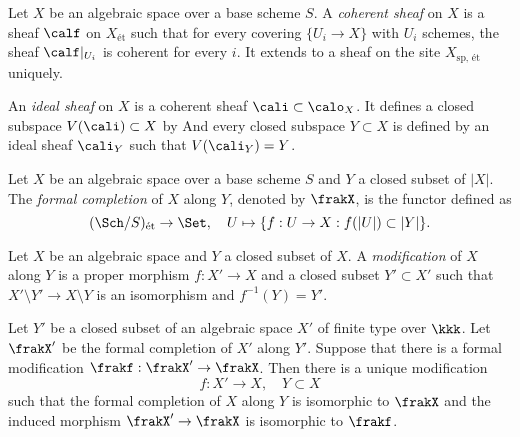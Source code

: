     \begin{definition}\label{def:coherent_sheaf_on_algebraic_space}
        Let \(X\) be an algebraic space over a base scheme \(S\).
        A \emph{coherent sheaf} on \(X\) is a sheaf \(\calf\) on \(X_{\text{\'et}}\) such that for every covering \(\{U_i \to X\}\) with \(U_i\) schemes, the sheaf \(\calf|_{U_i}\) is coherent for every \(i\).
        It extends to a sheaf on the site \(X_{\text{sp, \'et}}\) uniquely.

        An \emph{ideal sheaf} on \(X\) is a coherent sheaf \(\cali \subset \calo_X\).
        It defines a closed subspace \(V(\cali) \subset X\) by 
        And every closed subspace \(Y \subset X\) is defined by an ideal sheaf \(\cali_Y\) such that \(V(\cali_Y) = Y\).
    \end{definition}

    \begin{definition}\label{def:formal_completion_of_algebraic_space}
        Let \(X\) be an algebraic space over a base scheme \(S\) and \(Y\) a closed subset of \(|X|\).
        The \emph{formal completion} of \(X\) along \(Y\), denoted by \(\frakX\), is the functor defined as 
        \[ (\Sch/S)_{\text{\'et}} \to \Set, \quad U \mapsto \{f: U \to X: f(|U|) \subset |Y|\}. \]
    \end{definition}

    \begin{definition}\label{def:modification}
        Let \(X\) be an algebraic space and \(Y\) a closed subset of \(X\).
        A \emph{modification} of \(X\) along \(Y\) is a proper morphism \(f: X' \to X\) and a closed subset \(Y' \subset X'\) such that \(X'\setminus Y' \to X \setminus Y\) is an isomorphism and \(f^{-1}(Y) = Y'\).
    \end{definition}

    \begin{theorem}\label{thm:Artin_existence_of_modification}
        Let \(Y'\) be a closed subset of an algebraic space \(X'\) of finite type over \(\kkk\).
        Let \(\frakX'\) be the formal completion of \(X'\) along \(Y'\).
        Suppose that there is a formal modification \(\frakf: \frakX' \to \frakX\).
        Then there is a unique modification 
        \[ f: X' \to X, \quad Y \subset X \]
        such that the formal completion of \(X\) along \(Y\) is isomorphic to \(\frakX\) and the induced morphism \(\frakX' \to \frakX\) is isomorphic to \(\frakf\).
    \end{theorem}

